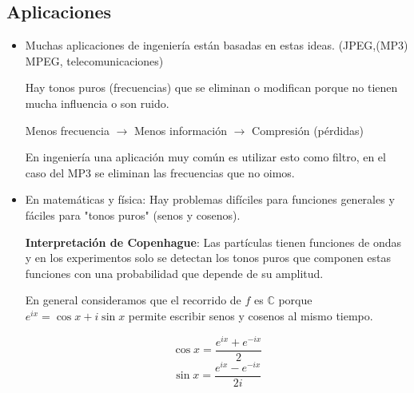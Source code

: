\subsection{Aplicaciones}
\begin{itemize}
	\item Muchas aplicaciones de ingeniería están basadas en estas ideas. (JPEG,(MP3) MPEG, telecomunicaciones)

	Hay tonos puros (frecuencias) que se eliminan o modifican porque no tienen mucha influencia o son ruido.

	Menos frecuencia $\rightarrow$ Menos información $\rightarrow$ Compresión (pérdidas)

	En ingeniería una aplicación muy común es utilizar esto como filtro, en el caso del MP3 se eliminan las frecuencias que no oimos.

	\item En matemáticas y física: Hay problemas difíciles para funciones generales y fáciles para "tonos puros" (senos y cosenos).

		\textbf{Interpretación de Copenhague}: Las partículas tienen funciones de ondas y en los experimentos solo se detectan los tonos puros que componen estas funciones con una probabilidad que depende de su amplitud.




%
%





	\obs En general consideramos que el recorrido de $f$ es $\mathbb{C}$ porque $e^{ix} = \cos x + i\sin x$ permite escribir senos y cosenos al mismo tiempo.

	$$\cos x = \frac{e^{ix} + e^{-ix}}{2}$$
	$$\sin x = \frac{e^{ix} - e^{-ix}}{2i}$$

\end{itemize}

